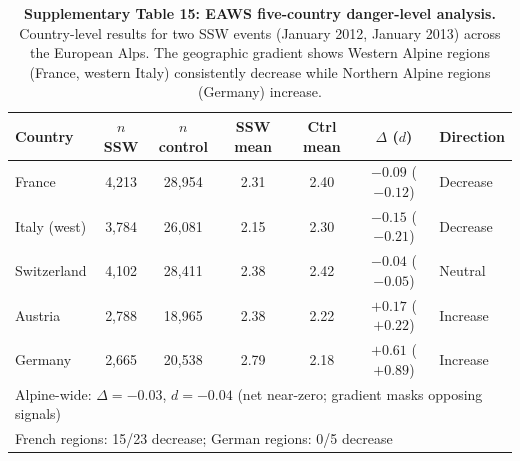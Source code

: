 \documentclass[11pt,letterpaper]{article}
\begin{document}
\begin{table}[!ht]
\centering
\caption{\textbf{Supplementary Table 15: EAWS five-country danger-level analysis.}
Country-level results for two SSW events (January 2012, January 2013) across the European Alps. The geographic gradient shows Western Alpine regions (France, western Italy) consistently decrease while Northern Alpine regions (Germany) increase.}
\label{tab:eaws}
\small
\begin{tabular}{lcccccl}
\toprule
Country & $n$ SSW & $n$ control & SSW mean & Ctrl mean & $\Delta$ ($d$) & Direction \\
\midrule
France & 4,213 & 28,954 & 2.31 & 2.40 & $-0.09$ ($-0.12$) & Decrease \\
Italy (west) & 3,784 & 26,081 & 2.15 & 2.30 & $-0.15$ ($-0.21$) & Decrease \\
Switzerland & 4,102 & 28,411 & 2.38 & 2.42 & $-0.04$ ($-0.05$) & Neutral \\
Austria & 2,788 & 18,965 & 2.38 & 2.22 & $+0.17$ ($+0.22$) & Increase \\
Germany & 2,665 & 20,538 & 2.79 & 2.18 & $+0.61$ ($+0.89$) & Increase \\
\midrule
\multicolumn{7}{l}{Alpine-wide: $\Delta = -0.03$, $d = -0.04$ (net near-zero; gradient masks opposing signals)} \\
\multicolumn{7}{l}{French regions: 15/23 decrease; German regions: 0/5 decrease} \\
\bottomrule
\end{tabular}
\end{table}
\end{document}
